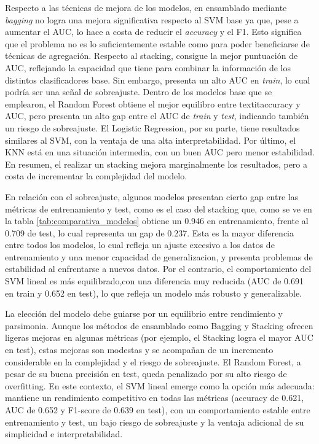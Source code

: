 \documentclass[a4paper,onecolumn]{extarticle}
\begin{document}
\begin{sloppypar}
Respecto a las técnicas de mejora de los modelos, en ensamblado mediante \textit{bagging} no logra una mejora significativa respecto al SVM base ya que, pese a 
aumentar el AUC, lo hace a costa de reducir el \textit{accuracy} y el F1. Esto significa que el problema no es lo suficientemente estable como para poder beneficiarse 
de técnicas de agregación. Respecto al stacking, consigue la mejor puntuación de AUC, reflejando la capacidad que tiene para combinar la información de los distintos 
clasificadores base. Sin embargo, presenta un alto AUC en \textit{train}, lo cual podría ser una señal de sobreajuste. Dentro de los modelos base que se emplearon,
el Random Forest obtiene el mejor equilibro entre textit{accuracy} y AUC, pero presenta un alto gap entre el AUC de \textit{train} y \textit{test}, indicando también 
un riesgo de sobreajuste. El Logistic Regression, por su parte, tiene resultados similares al SVM, con la ventaja de una alta interpretabilidad. Por último, el KNN 
está en una situación intermedia, con un buen AUC pero menor estabilidad. En resumen, el realizar un stacking mejora marginalmente los resultados, pero a costa de
incrementar la complejidad del modelo.

En relación con el sobreajuste, algunos modelos presentan cierto gap entre las métricas de entrenamiento y test, como es el caso del stacking que, como se ve en la tabla 
\ref{tab:comparativa_modelos} obtiene un 0.946 en entrenamiento, frente al 0.709 de test, lo cual representa un gap de 0.237. Esta es la mayor diferencia entre todos los 
modelos, lo cual refleja un ajuste excesivo a los datos de entrenamiento y una menor capacidad de generalizacion, y presenta problemas de estabilidad al enfrentarse a nuevos 
datos. Por el contrario, el comportamiento del SVM lineal es más equilibrado,con una diferencia muy reducida (AUC de 0.691 en train y 0.652 en test), lo que refleja un 
modelo más robusto y generalizable.

La elección del modelo debe guiarse por un equilibrio entre rendimiento y parsimonia. Aunque los métodos de ensamblado como Bagging y Stacking ofrecen ligeras mejoras
en algunas métricas (por ejemplo, el Stacking logra el mayor AUC en test), estas mejoras son modestas y se acompañan de un incremento considerable en la complejidad
y el riesgo de sobreajuste. El Random Forest, a pesar de su buena precisión en test, queda penalizado por su alto riesgo de overfitting. En este contexto, el SVM lineal
emerge como la opción más adecuada: mantiene un rendimiento competitivo en todas las métricas (accuracy de 0.621, AUC de 0.652 y F1-score de 0.639 en test), con un
comportamiento estable entre entrenamiento y test, un bajo riesgo de sobreajuste y la ventaja adicional de su simplicidad e interpretabilidad.


\end{sloppypar}
\end{document}
